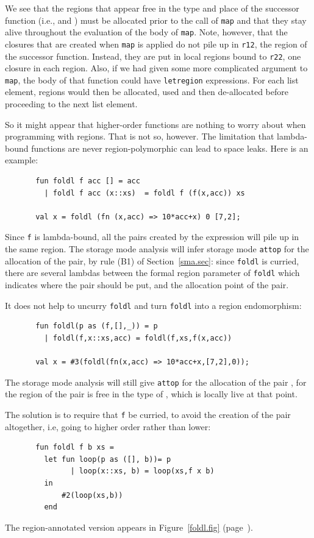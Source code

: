 \documentclass[12pt]{book}
\begin{document}
We see that the regions that appear free in the type and place of the successor
function (i.e.,  and ) must be allocated prior 
to the call of {\tt map} and that they stay
alive throughout the evaluation of the body of {\tt map}. Note, however, that
the closures that are created when {\tt map} is applied do not pile up in
{\tt r12}, the region of the successor function. Instead, they are put
in local regions bound to {\tt r22}, one closure in each region. 
Also, if we had given some
more complicated argument to {\tt map}, the body of that function could have
{\tt letregion} expressions. For each list element, regions would then be
allocated, used and then de-allocated before proceeding to the next list element.

So it might appear that higher-order functions are nothing to worry about when
programming with regions. That is not so, however. The limitation that lambda-bound
functions are never region-polymorphic can lead to space leaks. Here is an example:
\begin{verbatim}
       fun foldl f acc [] = acc
         | foldl f acc (x::xs)  = foldl f (f(x,acc)) xs

       val x = foldl (fn (x,acc) => 10*acc+x) 0 [7,2];
\end{verbatim}
Since {\tt f} is lambda-bound, all the pairs created by the expression 
will pile up in the same region. The storage mode analysis will infer storage mode {\tt attop}
for the allocation of the pair, by rule (B1) of Section~\ref{sma.sec}: since {\tt foldl} is
curried, 
there are several lambdas between the formal region parameter of {\tt foldl} which indicates
where the pair should be put, and the allocation point of the pair.

It does not help to uncurry {\tt foldl} and turn {\tt foldl} into a region endomorphism: 
\begin{verbatim}
       fun foldl(p as (f,[],_)) = p
         | foldl(f,x::xs,acc) = foldl(f,xs,f(x,acc))

       val x = #3(foldl(fn(x,acc) => 10*acc+x,[7,2],0));
\end{verbatim}
The storage mode analysis will still give {\tt attop} for
the allocation of the pair , for
the region of the pair is free in the type of ,
which is locally live at that point.

The solution is to require that {\tt f} be curried, to avoid the creation of the pair altogether, i.e, going to higher order
rather than lower:
\begin{verbatim}
       fun foldl f b xs = 
         let fun loop(p as ([], b))= p
               | loop(x::xs, b) = loop(xs,f x b)
         in
             #2(loop(xs,b))
         end
\end{verbatim}
The region-annotated version appears in Figure~\ref{foldl.fig}
(page~\pageref{foldl.fig}).
\end{document}
